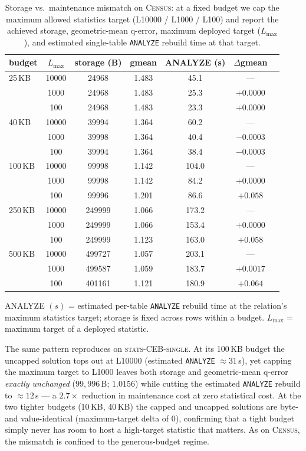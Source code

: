 \documentclass[sigconf, nonacm]{acmart}
\begin{document}
\begin{table}[t]
\caption{Storage vs.\ maintenance mismatch on \textsc{Census}: at a fixed budget
we cap the maximum allowed statistics target (L10000 / L1000 / L100) and report
the achieved storage, geometric-mean q-error, maximum deployed target ($L_{\max}$),
and estimated single-table \texttt{ANALYZE} rebuild time at that target.}
\label{tab:disc-mismatch}
\small
\begin{tabular}{lcccccc}
\toprule
budget & $L_{\max}$ & storage (B) & gmean & ANALYZE (s) & $\Delta$gmean\\
\midrule
25\,KB  & 10000 & 24968 & 1.483 & 45.1 & ---\\
        & 1000  & 24968 & 1.483 & 25.3 & $+0.0000$\\
        & 100   & 24968 & 1.483 & 23.3 & $+0.0000$\\
40\,KB  & 10000 & 39994 & 1.364 & 60.2 & ---\\
        & 1000  & 39998 & 1.364 & 40.4 & $-0.0003$\\
        & 100   & 39994 & 1.364 & 38.4 & $-0.0003$\\
100\,KB & 10000 & 99998 & 1.142 & 104.0 & ---\\
        & 1000  & 99998 & 1.142 & 84.2 & $+0.0000$\\
        & 100   & 99996 & 1.201 & 86.6 & $+0.058$\\
250\,KB & 10000 & 249999& 1.066 & 173.2 & ---\\
        & 1000  & 249999& 1.066 & 153.4 & $+0.0000$\\
        & 100   & 249999& 1.123 & 163.0 & $+0.058$\\
500\,KB & 10000 & 499727& 1.057 & 203.1 & ---\\
        & 1000  & 499587& 1.059 & 183.7 & $+0.0017$\\
        & 100   & 401161& 1.121 & 180.9 & $+0.064$\\
\bottomrule
\end{tabular}

{\footnotesize ANALYZE $(s)$ = estimated per-table \texttt{ANALYZE} rebuild time at
the relation's maximum statistics target; storage is fixed across rows within a
budget. $L_{\max}$ = maximum target of a deployed statistic.}
\end{table}

The same pattern reproduces on \textsc{stats-CEB-single}. At its 100\,KB budget the
uncapped solution tops out at L10000 (estimated \texttt{ANALYZE} $\approx\!31$\,s),
yet capping the maximum target to L1000 leaves both storage and geometric-mean
q-error \textit{exactly unchanged} ($99{,}996$\,B; $1.0156$) while cutting the
estimated \texttt{ANALYZE} rebuild to $\approx\!12$\,s --- a $2.7\times$ reduction
in maintenance cost at zero statistical cost. At the two tighter budgets (10\,KB,
40\,KB) the capped and uncapped solutions are byte- and value-identical (maximum-target
delta of 0), confirming that a tight budget simply never has room to host a high-target
statistic that matters. As on \textsc{Census}, the mismatch is confined to the
generous-budget regime.
\end{document}
